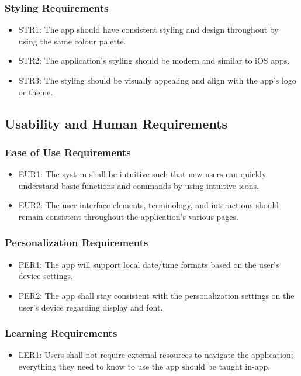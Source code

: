 \documentclass[12pt]{article}
\begin{document}
\subsubsection{Styling Requirements}
\begin{itemize}
\item STR1: The app should have consistent styling and design throughout by using the same colour palette.
\item STR2: The application’s styling should be modern and similar to iOS apps.
\item STR3: The styling should be visually appealing and align with the app’s logo or theme.
\end{itemize}

\subsection{Usability and Human Requirements}

\subsubsection{Ease of Use Requirements}
\begin{itemize}
\item EUR1: The system shall be intuitive such that new users can quickly understand basic functions and commands by using intuitive icons.
\item EUR2: The user interface elements, terminology, and interactions should remain consistent throughout the application’s various pages.
\end{itemize}

\subsubsection{Personalization Requirements}
\begin{itemize}
\item PER1: The app will support local date/time formats based on the user’s device settings.
\item PER2: The app shall stay consistent with the personalization settings on the user’s device regarding display and font.
\end{itemize}

\subsubsection{Learning Requirements}
\begin{itemize}
\item LER1: Users shall not require external resources to navigate the application; everything they need to know to use the app should be taught in-app.
\end{itemize}
\end{document}
